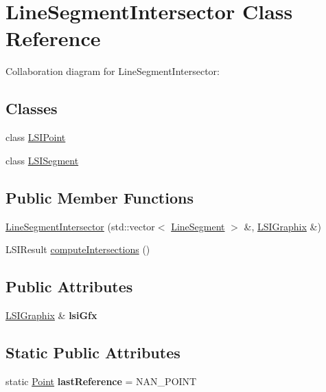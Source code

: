 \hypertarget{classLineSegmentIntersector}{}\section{Line\+Segment\+Intersector Class Reference}
\label{classLineSegmentIntersector}


Collaboration diagram for Line\+Segment\+Intersector\+:
\subsection*{Classes}
\begin{DoxyCompactItemize}
\item 
class \hyperlink{classLineSegmentIntersector_1_1LSIPoint}{L\+S\+I\+Point}
\item 
class \hyperlink{classLineSegmentIntersector_1_1LSISegment}{L\+S\+I\+Segment}
\end{DoxyCompactItemize}
\subsection*{Public Member Functions}
\begin{DoxyCompactItemize}
\item 
\hyperlink{classLineSegmentIntersector_abfe17083938ad4ee705fbe7d0051f209}{Line\+Segment\+Intersector} (std\+::vector$<$ \hyperlink{classLineSegment}{Line\+Segment} $>$ \&, \hyperlink{classLSIGraphix}{L\+S\+I\+Graphix} \&)
\item 
L\+S\+I\+Result \hyperlink{classLineSegmentIntersector_a261dcce43777e1954e81589ca89529ee}{compute\+Intersections} ()
\end{DoxyCompactItemize}
\subsection*{Public Attributes}
\begin{DoxyCompactItemize}
\item 
\mbox{\label{classLineSegmentIntersector_a82113ff9c3ccbf2c276c67a45401430a}} 
\hyperlink{classLSIGraphix}{L\+S\+I\+Graphix} \& {\bfseries lsi\+Gfx}
\end{DoxyCompactItemize}
\subsection*{Static Public Attributes}
\begin{DoxyCompactItemize}
\item 
\mbox{\label{classLineSegmentIntersector_a170c7914f53e24387e8e46cedf3a1290}} 
static \hyperlink{classPoint}{Point} {\bfseries last\+Reference} = N\+A\+N\+\_\+\+P\+O\+I\+NT
\end{DoxyCompactItemize}
